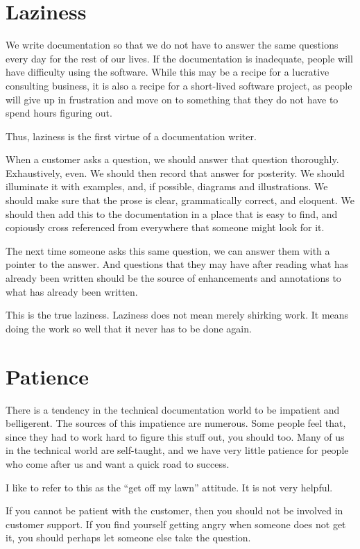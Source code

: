 \section*{Laziness}

We write documentation so that we do not have to answer the same questions every
day for the rest of our lives. If the documentation is inadequate, people will
have difficulty using the software. While this may be a recipe for a lucrative
consulting business, it is also a recipe for a short-lived software project, as
people will give up in frustration and move on to something that they do not
have to spend hours figuring out.

Thus, laziness is the first virtue of a documentation writer.

When a customer asks a question, we should answer that question thoroughly.
Exhaustively, even. We should then record that answer for posterity. We should
illuminate it with examples, and, if possible, diagrams and illustrations. We
should make sure that the prose is clear, grammatically correct, and eloquent.
We should then add this to the documentation in a place that is easy to find,
and copiously cross referenced from everywhere that someone might look for it.

The next time someone asks this same question, we can answer them with a pointer
to the answer. And questions that they may have after reading what has already
been written should be the source of enhancements and annotations to what has
already been written.

This is the true laziness. Laziness does not mean merely shirking work. It means
doing the work so well that it never has to be done again.

\section*{Patience}
There is a tendency in the technical documentation world to be impatient and
belligerent. The sources of this impatience are numerous. Some people feel that,
since they had to work hard to figure this stuff out, you should too. Many of us
in the technical world are self-taught, and we have very little patience for
people who come after us and want a quick road to success.

I like to refer to this as the ``get off my lawn'' attitude. It is not very
helpful.

If you cannot be patient with the customer, then you should not be involved in
customer support. If you find yourself getting angry when someone does not get
it, you should perhaps let someone else take the question.

